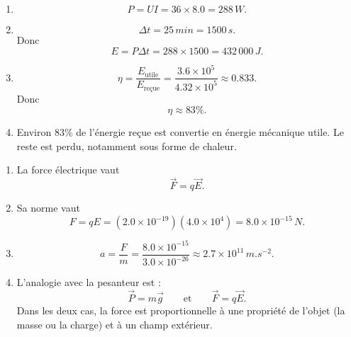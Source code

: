\documentclass[11pt,a4paper]{article}
\begin{document}
\begin{corrigebox}
\begin{enumerate}[label=\alph*)]
    \item
    \[
    P=UI=36\times 8.0=288\,\si{W}.
    \]

    \item
    \[
    \Delta t = 25\,\si{min}=1500\,\si{s}.
    \]
    Donc
    \[
    E=P\Delta t = 288\times 1500 = 432\,000\,\si{J}.
    \]

    \item
    \[
    \eta=\frac{E_{\text{utile}}}{E_{\text{reçue}}}
    =\frac{3.6\times 10^5}{4.32\times 10^5}
    \approx 0.833.
    \]
    Donc
    \[
    \eta \approx 83\%.
    \]

    \item Environ \(83\%\) de l'énergie reçue est convertie en énergie mécanique utile. Le reste est perdu, notamment sous forme de chaleur.
\end{enumerate}
\end{corrigebox}

\begin{corrigebox}
\begin{enumerate}[label=\alph*)]
    \item La force électrique vaut
    \[
    \vec{F}=q\vec{E}.
    \]

    \item Sa norme vaut
    \[
    F=qE=(2.0\times 10^{-19})(4.0\times 10^4)=8.0\times 10^{-15}\,\si{N}.
    \]

    \item
    \[
    a=\frac{F}{m}
    =\frac{8.0\times 10^{-15}}{3.0\times 10^{-26}}
    \approx 2.7\times 10^{11}\,\si{m.s^{-2}}.
    \]

    \item L'analogie avec la pesanteur est :
    \[
    \vec{P}=m\vec{g}
    \qquad \text{et} \qquad
    \vec{F}=q\vec{E}.
    \]
    Dans les deux cas, la force est proportionnelle à une propriété de l'objet (la masse ou la charge) et à un champ extérieur.
\end{enumerate}
\end{corrigebox}
\end{document}
